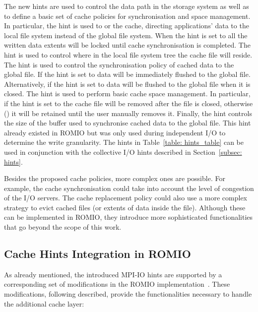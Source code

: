 The new hints are used to control the data path in the storage system as well as to define a basic set of cache policies for synchronisation and space management. In particular, the  hint is used to  or  the cache, directing applications' data to the local file system instead of the global file system. When the hint is set to  all the written data extents will be locked until cache synchronisation is completed. The  hint is used to control where in the local file system tree the cache file will reside. The  hint is used to control the synchronisation policy of cached data to the global file. If the hint is set to  data will be immediately flushed to the global file. Alternatively, if the hint is set to  data will be flushed to the global file when it is closed. The  hint is used to perform basic cache space management. In particular, if the hint is set to  the cache file will be removed after the file is closed, otherwise () it will be retained until the user manually removes it. Finally, the  hint controls the size of the buffer used to synchronise cached data to the global file. This hint already existed in ROMIO but was only used during independent I/O to determine the write granularity. The hints in Table~\ref{table: hints_table} can be used in conjunction with the collective I/O hints described in Section~\ref{subsec: hints}.

Besides the proposed cache policies, more complex ones are possible. For example, the cache synchronisation could take into account the level of congestion of the I/O servers. The cache replacement policy could also use a more complex strategy to evict cached files (or extents of data inside the file). Although these can be implemented in ROMIO, they introduce more sophisticated functionalities that go beyond the scope of this work.

\subsection{Cache Hints Integration in ROMIO}
\label{subsec: support}
As already mentioned, the introduced MPI-IO hints are supported by a corresponding set of modifications in the ROMIO implementation~\cite{E10-DEEPER}. These modifications, following described, provide the functionalities necessary to handle the additional cache layer:

